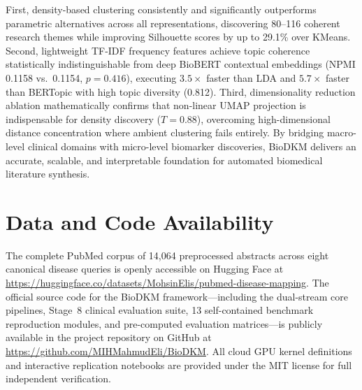 \documentclass[a4paper,fleqn]{cas-dc}
\begin{document}
First, density-based clustering consistently and significantly outperforms parametric alternatives across all representations, discovering 80--116 coherent research themes while improving Silhouette scores by up to 29.1\% over KMeans. Second, lightweight TF-IDF frequency features achieve topic coherence statistically indistinguishable from deep BioBERT contextual embeddings (NPMI 0.1158 vs.\ 0.1154, $p=0.416$), executing $3.5\times$ faster than LDA and $5.7\times$ faster than BERTopic with high topic diversity (0.812). Third, dimensionality reduction ablation mathematically confirms that non-linear UMAP projection is indispensable for density discovery ($T=0.88$), overcoming high-dimensional distance concentration where ambient clustering fails entirely. By bridging macro-level clinical domains with micro-level biomarker discoveries, BioDKM delivers an accurate, scalable, and interpretable foundation for automated biomedical literature synthesis.

\section*{Data and Code Availability}

The complete PubMed corpus of 14,064 preprocessed abstracts across eight canonical disease queries is openly accessible on Hugging Face at \url{https://huggingface.co/datasets/MohsinElis/pubmed-disease-mapping}. The official source code for the BioDKM framework—including the dual-stream core pipelines, Stage~8 clinical evaluation suite, 13 self-contained benchmark reproduction modules, and pre-computed evaluation matrices—is publicly available in the project repository on GitHub at \url{https://github.com/MIHMahmudEli/BioDKM}. All cloud GPU kernel definitions and interactive replication notebooks are provided under the MIT license for full independent verification.

\printcredits
\end{document}
